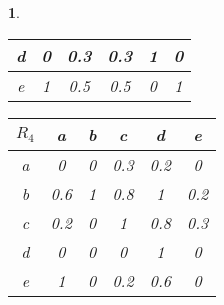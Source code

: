 \documentclass[11pt,a4paper,oneside]{article}
\newenvironment{problem}{
	\medskip
	\begin{problem-internal}
	}{
	\end{problem-internal}
}
\newtheorem{problem-internal}{}
\newcommand{\+}{$\boldsymbol{+}$}
\begin{document}
\begin{problem}
\begin{table}[!htbp]
\begin{tabular}{|c|c|c|c|c|c|}
				d     & 0 & 0.3 & 0.3 & 1 & 0   \\ \hline
				e     & 1 & 0.5 & 0.5 & 0 & 1   \\ \hline
			\end{tabular}
			\quad
			\centering
			\begin{tabular}{|c|c|c|c|c|c|}
				\hline
				$R_4$ & a   & b & c   & d   & e   \\ \hline
				a     & 0   & 0 & 0.3 & 0.2 & 0   \\ \hline
				b     & 0.6 & 1 & 0.8 & 1   & 0.2 \\ \hline
				c     & 0.2 & 0 & 1   & 0.8 & 0.3 \\ \hline
				d     & 0   & 0 & 0   & 1   & 0   \\ \hline
				e     & 1   & 0 & 0.2 & 0.6 & 0   \\ \hline
			\end{tabular}
		\end{table}
	\end{problem}
	
\end{document}

